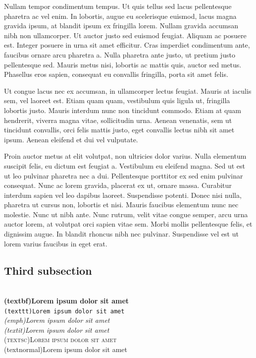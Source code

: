 \documentclass{article}
\begin{document}
Nullam tempor condimentum tempus. Ut quis tellus sed lacus pellentesque pharetra ac vel enim. In lobortis, augue eu scelerisque euismod, lacus magna gravida ipsum, at blandit ipsum ex fringilla lorem. Nullam gravida accumsan nibh non ullamcorper. Ut auctor justo sed euismod feugiat. Aliquam ac posuere est. Integer posuere in urna sit amet efficitur. Cras imperdiet condimentum ante, faucibus ornare arcu pharetra a. Nulla pharetra ante justo, ut pretium justo pellentesque sed. Mauris metus nisi, lobortis ac mattis quis, auctor sed metus. Phasellus eros sapien, consequat eu convallis fringilla, porta sit amet felis.

Ut congue lacus nec ex accumsan, in ullamcorper lectus feugiat. Mauris at iaculis sem, vel laoreet est. Etiam quam quam, vestibulum quis ligula ut, fringilla lobortis justo. Mauris interdum nunc non tincidunt commodo. Etiam at quam hendrerit, viverra magna vitae, sollicitudin urna. Aenean venenatis, sem ut tincidunt convallis, orci felis mattis justo, eget convallis lectus nibh sit amet ipsum. Aenean eleifend et dui vel vulputate.

Proin auctor metus at elit volutpat, non ultricies dolor varius. Nulla elementum suscipit felis, eu dictum est feugiat a. Vestibulum eu eleifend magna. Sed ut est ut leo pulvinar pharetra nec a dui. Pellentesque porttitor ex sed enim pulvinar consequat. Nunc ac lorem gravida, placerat ex ut, ornare massa. Curabitur interdum sapien vel leo dapibus laoreet. Suspendisse potenti. Donec nisi nulla, pharetra ut cursus non, lobortis et nisi. Mauris faucibus elementum nunc nec molestie. Nunc ut nibh ante. Nunc rutrum, velit vitae congue semper, arcu urna auctor lorem, at volutpat orci sapien vitae sem. Morbi mollis pellentesque felis, et dignissim augue. In blandit rhoncus nibh nec pulvinar. Suspendisse vel est ut lorem varius faucibus in eget erat.

\subsection{Third subsection} \\
\textbf{(textbf)Lorem ipsum dolor sit amet} \\
\texttt{(texttt)Lorem ipsum dolor sit amet} \\
\emph{(emph)Lorem ipsum dolor sit amet}\\
\textit{(textit)Lorem ipsum dolor sit amet} \\
\textsc{(textsc)Lorem ipsum dolor sit amet}\\
\textnormal{(textnormal)Lorem ipsum dolor sit amet}\\
\end{document}
